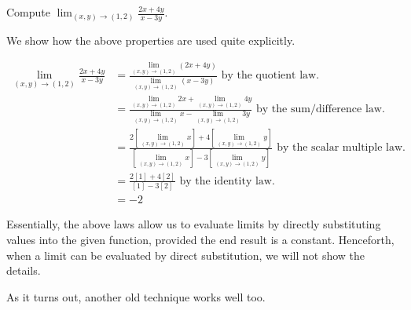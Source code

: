 \documentclass{ximera}
\begin{document}
\begin{example}
Compute $\lim_{(x,y)\to(1,2)} \frac{2x+4y}{x-3y}$.

\begin{explanation}
We show how the above properties are used quite explicitly.

\begin{align*}
\lim_{(x,y)\to(1,2)} \frac{2x+4y}{x-3y} & = \frac{\lim_{(x,y)\to(1,2)}(2x+4y)}{\lim_{(x,y)\to(1,2)}(x-3y)} \textrm{  by the quotient law. } \\
&=  \frac{\lim_{(x,y)\to(1,2)}2x+\lim_{(x,y)\to(1,2)} 4y}{\lim_{(x,y)\to(1,2)}x-\lim_{(x,y)\to(1,2)}3y}  \textrm{ by the sum/difference law. } \\
&=  \frac{2\left[\lim_{(x,y)\to(1,2)}x\right]+4\left[\lim_{(x,y)\to(1,2)} y\right]}{\left[\lim_{(x,y)\to(1,2)}x\right]-3\left[\lim_{(x,y)\to(1,2)}y\right]}  \textrm{ by the scalar multiple law. } \\
&= \frac{2[1]+4[2]}{[1]-3[2]} \textrm{ by the identity law. } \\
&= -2
\end{align*}
\end{explanation}
\end{example}

Essentially, the above laws allow us to evaluate limits by directly substituting values into the given function, provided the end result is a constant.  Henceforth, when a limit can be evaluated by direct substitution, we will not show the details.

As it turns out, another old technique works well too.


\end{document}
